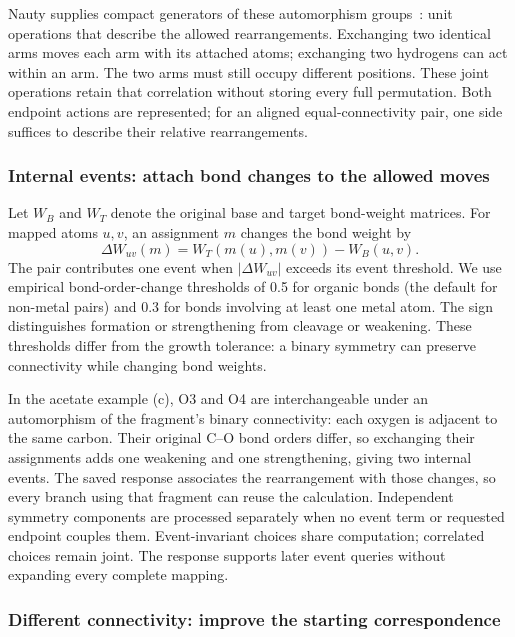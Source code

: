 Nauty supplies compact generators of these automorphism groups~\citep{mckay2014}: unit operations that describe the allowed rearrangements. Exchanging two identical arms moves each arm with its attached atoms; exchanging two hydrogens can act within an arm. The two arms must still occupy different positions. These joint operations retain that correlation without storing every full permutation. Both endpoint actions are represented; for an aligned equal-connectivity pair, one side suffices to describe their relative rearrangements.

\subsubsection{Internal events: attach bond changes to the allowed moves}

Let $W_B$ and $W_T$ denote the original base and target bond-weight matrices. For mapped atoms $u,v$, an assignment $m$ changes the bond weight by
\begin{equation}
 \Delta W_{uv}(m)=W_T(m(u),m(v))-W_B(u,v).
 \label{eq:local-event}
\end{equation}
The pair contributes one event when $|\Delta W_{uv}|$ exceeds its event threshold. We use empirical bond-order-change thresholds of 0.5 for organic bonds (the default for non-metal pairs) and 0.3 for bonds involving at least one metal atom. The sign distinguishes formation or strengthening from cleavage or weakening. These thresholds differ from the growth tolerance: a binary symmetry can preserve connectivity while changing bond weights.

In the acetate example (c), O3 and O4 are interchangeable under an automorphism of the fragment's binary connectivity: each oxygen is adjacent to the same carbon. Their original C--O bond orders differ, so exchanging their assignments adds one weakening and one strengthening, giving two internal events. The saved response associates the rearrangement with those changes, so every branch using that fragment can reuse the calculation. Independent symmetry components are processed separately when no event term or requested endpoint couples them. Event-invariant choices share computation; correlated choices remain joint. The response supports later event queries without expanding every complete mapping.

\subsubsection{Different connectivity: improve the starting correspondence}

